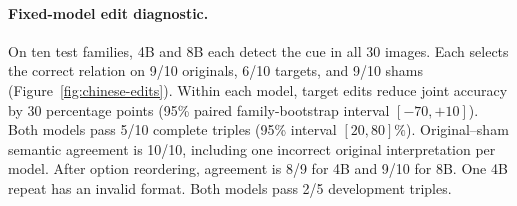 \paragraph{Fixed-model edit diagnostic.}
On ten test families, 4B and 8B each detect the cue in all 30 images. Each selects the correct relation on 9/10 originals, 6/10 targets, and 9/10 shams (Figure~\ref{fig:chinese-edits}). Within each model, target edits reduce joint accuracy by 30 percentage points (95\% paired family-bootstrap interval $[-70,+10]$). Both models pass 5/10 complete triples (95\% interval $[20,80]\%$). Original--sham semantic agreement is 10/10, including one incorrect original interpretation per model. After option reordering, agreement is 8/9 for 4B and 9/10 for 8B. One 4B repeat has an invalid format. Both models pass 2/5 development triples.

